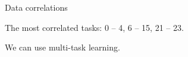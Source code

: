 \documentclass[xcolor=table]{beamer}
\newcommand{\hdir}{.}
\begin{document}
	         












\begin{frame}{Data correlations}
	\begin{figure}[!h]
	 \end{figure}
	\vspace{-0.5cm}
	The most correlated tasks: 0 -- 4, 6 -- 15, 21 -- 23. 

	We can use multi-task learning.

\end{frame}
\end{document}
